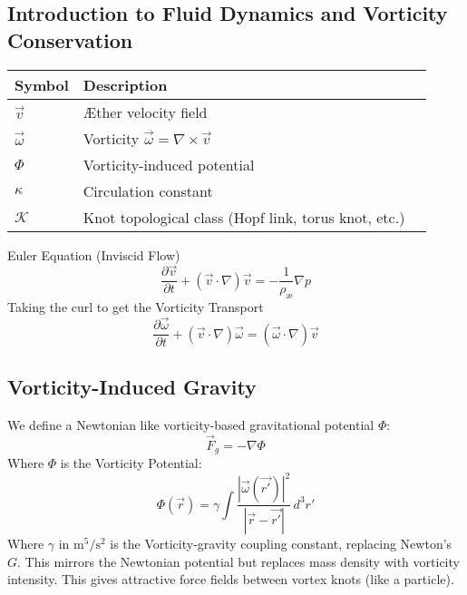 \subsection*{Introduction to Fluid Dynamics and Vorticity Conservation}

\begin{table}[htbp]
    \centering
    \begin{tabular}{llc}
        \hline
        Symbol & Description \\
        \hline
        \midrule
        \(\vec{v}\) & Æther velocity field \\
        \(\vec{\omega}\) &  Vorticity \(\vec{\omega} = \nabla \times \vec{v}\) \\
        \(\Phi\) & Vorticity-induced potential \\
        \(\kappa\) & Circulation constant \\
        \(\mathcal{K}\) & Knot topological class (Hopf link, torus knot, etc.) \\
        \bottomrule
        \hline
    \end{tabular}\label{tab:table2}
\end{table}

Euler Equation (Inviscid Flow)
\begin{equation}
    \frac{\partial \vec{v}}{\partial t} + (\vec{v} \cdot \nabla)\vec{v} = -\frac{1}{\rho_\text{æ}} \nabla p\label{eq:Euler-Equation}
\end{equation}
Taking the curl to get the Vorticity Transport
\begin{equation}
    \frac{\partial \vec{\omega}}{\partial t} + (\vec{v} \cdot \nabla)\vec{\omega} = (\vec{\omega} \cdot \nabla) \vec{v}\label{eq:Vorticity-Transport}
\end{equation}

\subsection*{Vorticity-Induced Gravity}
We define a Newtonian like vorticity-based gravitational potential $\Phi$:
\begin{equation}
    \vec{F}_g = -\nabla \Phi\label{eq:Vorticity-Induced-Gravity}
\end{equation}
Where $\Phi$ is the Vorticity Potential:
\begin{equation}
    \Phi(\vec{r}) = \gamma \int \frac{|\vec{\omega}(\vec{r'})|^2}{|\vec{r} - \vec{r'}|} \, d^3r'\label{eq:Vorticity_Potential}
\end{equation}
Where \textbf{$\gamma$} in \textbf{$\text{m}^5 / \text{s}^{2}$} is the Vorticity-gravity coupling constant, replacing Newton's $G$. This mirrors the Newtonian potential but replaces mass density with vorticity intensity. This gives attractive force fields between vortex knots (like a particle).




